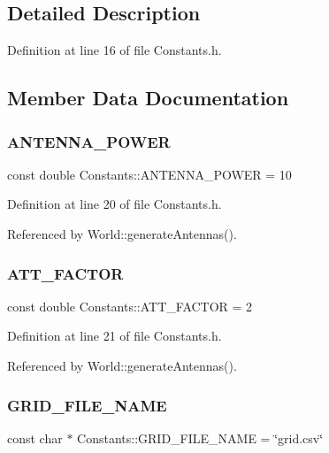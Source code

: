 \subsection{Detailed Description}


Definition at line 16 of file Constants.\+h.



\subsection{Member Data Documentation}
\mbox{\label{class_constants_a3f6f3825098d8eb1dc8081158c46c48a}} 
\subsubsection{ANTENNA\_POWER}
{\footnotesize\ttfamily const double Constants\+::\+A\+N\+T\+E\+N\+N\+A\+\_\+\+P\+O\+W\+ER = 10\hspace{0.3cm}{\ttfamily [static]}}



Definition at line 20 of file Constants.\+h.



Referenced by World\+::generate\+Antennas().

\mbox{\label{class_constants_a3738ccd4e7931b93885bdedf98528293}} 
\subsubsection{ATT\_FACTOR}
{\footnotesize\ttfamily const double Constants\+::\+A\+T\+T\+\_\+\+F\+A\+C\+T\+OR = 2\hspace{0.3cm}{\ttfamily [static]}}



Definition at line 21 of file Constants.\+h.



Referenced by World\+::generate\+Antennas().

\mbox{\label{class_constants_a4cefd531a29c345b8e0524e864048373}} 
\subsubsection{GRID\_FILE\_NAME}
{\footnotesize\ttfamily const char $\ast$ Constants\+::\+G\+R\+I\+D\+\_\+\+F\+I\+L\+E\+\_\+\+N\+A\+ME = \char`\"{}grid.\+csv\char`\"{}\hspace{0.3cm}{\ttfamily [static]}}



